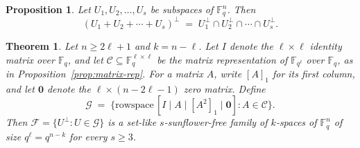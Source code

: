 \documentclass[10pt,a4paper]{amsart}
\newtheorem{proposition}{Proposition}
\newtheorem{theorem}{Theorem}
\newcommand{\F}{\mathbb{F}}
\newcommand{\rs}{\mathrm{rowspace}\,}
\begin{document}
\begin{proposition}\label{prop:sum-complement}
Let $U_1, U_2, \ldots, U_s$ be subspaces of $\F_q^n$. Then
\[
(U_1 + U_2 + \cdots + U_s)^\perp \;=\; U_1^\perp \cap U_2^\perp \cap \cdots \cap U_s^\perp.
\]
\end{proposition}

\begin{theorem}\label{thm:construction}
Let $n \geq 2\ell + 1$ and $k = n - \ell$. Let $I$ denote the $\ell \times \ell$ identity matrix over $\F_q$, and let $\mathcal{C} \subseteq \F_q^{\ell \times \ell}$ be the matrix representation of $\F_{q^\ell}$ over $\F_q$, as in Proposition~\ref{prop:matrix-rep}. For a matrix $A$, write $[A]_1$ for its first column, and let $\mathbf{0}$ denote the $\ell \times (n - 2\ell - 1)$ zero matrix. Define
\[
\mathcal{G} \;=\; \bigl\{ \rs [I \mid A \mid [A^2]_1 \mid \mathbf{0}] : A \in \mathcal{C}\bigr\}.
\]
Then $\mathcal{F} = \{U^\perp : U \in \mathcal{G}\}$ is a set-like $s$-sunflower-free family of $k$-spaces of $\F_q^n$ of size $q^\ell = q^{n-k}$ for every $s \geq 3$.
\end{theorem}
\end{document}
